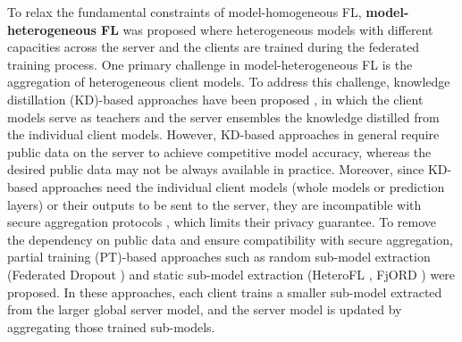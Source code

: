 \documentclass{article}
\newcommand{\Samiul}[1]{\textcolor{blue}{#1}}
\begin{document}
To relax the fundamental constraints of model-homogeneous FL, \textbf{model-heterogeneous FL} was proposed where heterogeneous models with different capacities across the server and the clients are trained during the federated training process. 
%
One primary challenge in model-heterogeneous FL is the aggregation of heterogeneous client models.
To address this challenge, knowledge distillation (KD)-based approaches have been proposed \citep{he2020group,lin2020ensemble,  itahara2020distillation, cho2022heterogeneous}, in which the client models serve as teachers and the server ensembles the knowledge distilled from the individual client models. 
However, KD-based approaches in general require public data on the server to achieve competitive model accuracy, whereas the desired public data may not be always available in practice.
Moreover, since KD-based approaches need the individual client models (whole models or prediction layers) or their outputs to be sent to the server, they are incompatible with secure aggregation protocols \citep{bonawitz2016practical}, which limits their privacy guarantee.
%
To remove the dependency on public data and ensure compatibility with secure aggregation,  partial training (PT)-based approaches such as random sub-model extraction (Federated Dropout \citep{caldas2018expanding}) and static sub-model extraction (HeteroFL \citep{diao2020heterofl}, FjORD \citep{horvath2021fjord}) were proposed. In these approaches, each client trains a smaller sub-model extracted from the larger global server model, and the server model is updated by aggregating those trained sub-models. 
\end{document}
